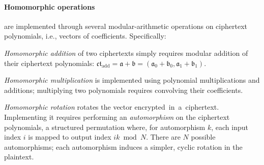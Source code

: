

\paragraph{Homomorphic operations} are implemented through several modular-arithmetic operations on ciphertext polynomials, i.e., vectors of coefficients. Specifically:
\begin{compactitem}
\item \emph{Homomorphic addition} of two ciphertexts simply requires modular addition of their ciphertext polynomials:
    $\mathfrak{ct}_{\textrm{add}} = \mathfrak{a} + \mathfrak{b} = (\mathfrak{a}_0+\mathfrak{b}_0, \mathfrak{a}_1+\mathfrak{b}_1)$.
\item \emph{Homomorphic multiplication} is implemented using polynomial multiplications and additions;
  multiplying two polynomials requires convolving their coefficients.
\item \emph{Homomorphic rotation} rotates the vector encrypted~in~a~ciphertext.
  Implementing it requires performing an \emph{automorphism} on the ciphertext polynomials,
  a structured permutation where, for automorphism $k$, each input index $i$ is mapped to output index $ik \bmod N$.
  There are $N$ possible automorphisms; each automorphism induces a simpler, cyclic rotation in the plaintext.

\end{compactitem}

